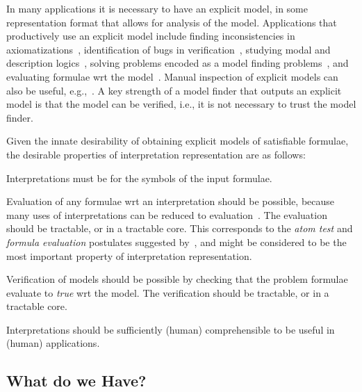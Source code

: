 \documentclass{ceurart}
\newenvironment{packed_enumerate}{
\vspace*{-0.3em}
\begin{enumerate}
\setlength{\partopsep}{0pt}
\setlength{\itemsep}{1pt}
\setlength{\parskip}{0pt}
\setlength{\parsep}{0pt}
}{\end{enumerate}}
\begin{document}
In many applications it is necessary to have an explicit model, in some representation format that
allows for analysis of the model.
Applications that productively use an explicit model include finding inconsistencies in 
axiomatizations~\cite{SS+17}, identification of bugs in verification~\cite{CE82,QS82},
studying modal and description logics~\cite{SH13}, solving problems encoded as a model finding 
problems~\cite{Win82}, and evaluating formulae wrt the model~\cite{SS+23-LPAR}.
Manual inspection of explicit models can also be useful, e.g.,~\cite{EK+10}.
A key strength of a model finder that outputs an explicit model is that the model can be verified,
i.e., it is not necessary to trust the model finder.

Given the innate desirability of obtaining explicit models of satisfiable formulae, the desirable
properties of interpretation representation are as follows:
\begin{packed_enumerate}
\item Interpretations must be for the symbols of the input formulae.
\item Evaluation of any formulae wrt an interpretation should be possible, because many uses of
      interpretations can be reduced to evaluation~\cite[\S3.2]{CLP04}.
      The evaluation should be tractable, or in a tractable core.
      This corresponds to the \emph{atom test} and \emph{formula evaluation} postulates suggested
      by~\cite{FL96,CLP04}, and might be considered to be the most important property of
      interpretation representation.
\item Verification of models should be possible by checking that the problem formulae evaluate 
      to \textit{true} wrt the model.
      The verification should be tractable, or in a tractable core.
\item Interpretations should be sufficiently (human) comprehensible to be useful in (human)
      applications.
\end{packed_enumerate}

\subsection{What do we Have?}
\label{Have}
\end{document}
